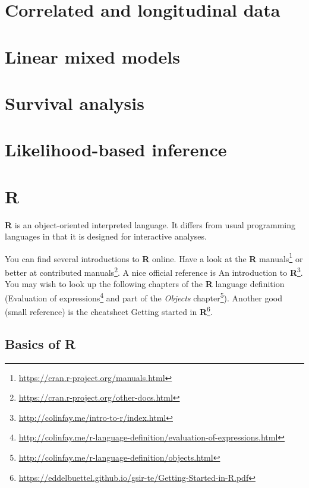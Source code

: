 \documentclass[
  11pt,
  letterpaper,
]{book}
\renewcommand{\href}[2]{#2\footnote{\url{#1}}}
\theoremstyle{definition}
\theoremstyle{definition}
\theoremstyle{definition}
\theoremstyle{remark}
\begin{document}
\hypertarget{correlated-longitudinal-data}{%
\chapter{Correlated and longitudinal data}\label{correlated-longitudinal-data}}

\hypertarget{linear-mixed-models}{%
\chapter{Linear mixed models}\label{linear-mixed-models}}

\hypertarget{survival}{%
\chapter{Survival analysis}\label{survival}}

\hypertarget{likelihood}{%
\chapter{Likelihood-based inference}\label{likelihood}}

\hypertarget{appendix-appendix}{%
\appendix}


\hypertarget{r}{%
\chapter*{\texorpdfstring{\textbf{R}}{R}}\label{r}}

\textbf{R} is an object-oriented interpreted language. It differs from usual programming languages in that it is designed for interactive analyses.

You can find several introductions to \textbf{R} online. Have a look at the \href{https://cran.r-project.org/manuals.html}{\textbf{R} manuals} or better at \href{https://cran.r-project.org/other-docs.html}{contributed manuals}. A nice official reference is \href{http://colinfay.me/intro-to-r/index.html}{An introduction to \textbf{R}}.
You may wish to look up the following chapters of the \textbf{R} language definition (\href{http://colinfay.me/r-language-definition/evaluation-of-expressions.html}{Evaluation of expressions} and part of the \href{http://colinfay.me/r-language-definition/objects.html}{\emph{Objects} chapter}). Another good (small reference) is the cheatsheet \href{https://eddelbuettel.github.io/gsir-te/Getting-Started-in-R.pdf}{Getting started in \textbf{R}}.

\hypertarget{basics-of-r}{%
\section{\texorpdfstring{Basics of \textbf{R}}{Basics of R}}\label{basics-of-r}}
\end{document}
